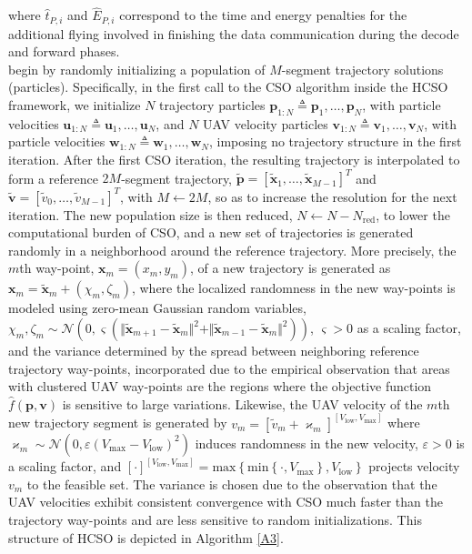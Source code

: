 \documentclass[10pt, twocolumn]{IEEEtran}
\theoremstyle{plain}
\theoremstyle{definition}
\theoremstyle{remark}
\begin{document}
where $\hat{t}_{P,i}$ and $\hat{E}_{P,i}$ correspond to the time and energy penalties for the additional flying involved in finishing the data communication during the decode and forward phases.\\
 begin by randomly initializing a population of $M$-segment trajectory solutions (particles). Specifically, in the first call to the CSO algorithm \cite{CSO} inside the HCSO framework, we initialize $N$ trajectory particles $\mathbf{p}_{1:N}{\triangleq}\mathbf{p}_{1},{\dots},\mathbf{p}_{N}$, with particle velocities $\mathbf{u}_{1:N}{\triangleq}\mathbf{u}_{1},{\dots},\mathbf{u}_{N}$, and $N$ UAV velocity particles $\mathbf{v}_{1:N}{\triangleq}\mathbf{v}_{1},{\dots},\mathbf{v}_{N}$, with particle velocities $\mathbf{w}_{1:N}{\triangleq}\mathbf{w}_{1},{\dots},\mathbf{w}_{N}$, imposing no trajectory structure in the first iteration. After the first CSO iteration, the resulting trajectory is interpolated to form a reference $2M$-segment trajectory, $\tilde{\mathbf{p}}{=}[\tilde{\mathbf{x}}_{1},{\dots},\tilde{\mathbf{x}}_{M{-}1}]^{T}$ and $\tilde{\mathbf{v}}{=}[\tilde{v}_{0},{\dots},\tilde{v}_{M{-}1}]^{T}$, with $M{\gets}2M$, so as to increase the resolution for the next iteration. The new population size is then reduced, $N{\gets}N{-}N_{\mathrm{red}}$, to lower the computational burden of CSO, and a new set of trajectories is generated randomly in a neighborhood around the reference trajectory. More precisely, the $m$th way-point, $\mathbf{x}_{m}{=}(x_{m},y_{m})$, of a new trajectory is generated as $\mathbf{x}_{m}{=}\tilde{\mathbf{x}}_{m}{+}(\chi_{m},\zeta_{m})$,
where the localized randomness in the new way-points is modeled using zero-mean Gaussian random variables, $\chi_{m},\zeta_{m}{\sim}\mathcal{N}\left(0,\varsigma\left(\Vert\tilde{\mathbf{x}}_{m{+}1}{-}\tilde{\mathbf{x}}_{m}\Vert^{2}{+}\Vert\tilde{\mathbf{x}}_{m{-}1}{-}\tilde{\mathbf{x}}_{m}\Vert^2\right)\right)$, $\varsigma{>}0$ as a scaling factor, and the variance determined by the spread between neighboring reference trajectory way-points, incorporated due to the empirical observation that areas with clustered UAV way-points are the regions where the objective function $\hat{f}(\mathbf{p},\mathbf{v})$ is sensitive to large variations. Likewise, the UAV velocity of the $m$th new trajectory segment is generated by $v_{m}{=}[\tilde{v}_{m}{+}\varkappa_{m}]^{[V_{\mathrm{low}},V_{\mathrm{max}}]}$
where $\varkappa_{m}{\sim}\mathcal{N}\left(0,\varepsilon\left(V_{\mathrm{max}}{-}V_{\mathrm{low}}\right)^{2}\right)$ induces randomness in the new velocity, $\varepsilon{>}0$ is a scaling factor, and $[\cdot]^{[V_{\mathrm{low}},V_{\mathrm{max}}]}{=}\mathrm{max}\left\{ \mathrm{min}\left\{\cdot,V_{\mathrm{max}}\right\},V_{\mathrm{low}}\right\}$ projects velocity $v_{m}$ to the feasible set. The variance is chosen due to the observation that the UAV velocities exhibit consistent convergence with CSO much faster than the trajectory way-points and are less sensitive to random initializations. This structure of HCSO is depicted in Algorithm \ref{A3}.
\end{document}
